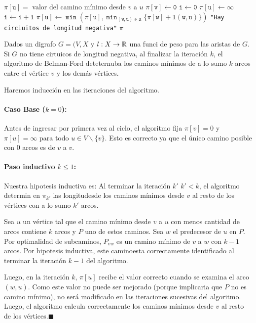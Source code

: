 \begin{algorithmic}
  \State $\mathtt{\pi[u] =}$ valor del camino mínimo desde $v$ a $u$
  \State
  \State $\mathtt{\pi[v] \gets 0}$
  \State $\mathtt{i \gets 0}$
  \State $\mathtt{\pi[u] \gets \infty}$
  \EndFor
  \State
  \State $\mathtt{i\gets i + 1}$
  \State $\mathtt{\pi[u] \gets \min(\pi[u], \min_{(w,u)\in X}\{\pi[w] + l(w,u)\})}$
  \EndFor
  \EndWhile
  \State\Return\texttt{"Hay circiuitos de longitud negativa"}
  \Else
  \State\Return \(\pi\)
  \EndIf
  \EndProcedure
\end{algorithmic}

\begin{lema}
  Dados un digrafo \(G=(V,X\) y \(l:X\to\mathbb{R}\) una funci de peso para las aristas de \(G\). Si \(G\) no tiene cirtuicos de longitud negativa, al finalizar la iteración \(k\), el algoritmo de Belman-Ford deteternuba los caminos mínimos de a lo sumo \(k\) arcos entre el vértice \(v\) y los demás vértices.
\end{lema}

\begin{demo}
  Haremos inducción en las iteraciones del algoritmo.

  \paragraph{Caso Base (\(k=0\)):} Antes de ingresar por primera vez al ciclo, el algoritmo fija \(\pi[v] = 0\) y \(\pi[u] = \infty\) para todo \(u\in V\backslash \{v\}\). Esto es correcto ya que el único camino posible con 0 arcos es de \(v\) a \(v\).

  \paragraph{Paso inductivo \(k \leq 1\):} Nuestra hipotesis inductiva es: Al terminar la iteración \(k'\) \( k' < k\), el algoritmo determin en \(\pi_{k'}\) las longitudesde los caminos mínimos desde \(v\) al resto de los vértices con a lo sumo \(k'\) arcos.

  Sea \(u\) un vértice tal que el camino mínimo desde \(v\) a \(u\) con menos cantidad de arcos contiene \(k\) arcos y \(P\) uno de estos caminos. Sea \(w\) el predecesor de \(u\) en \(P\). Por optimalidad de subcaminos, \(P_{vw}\) es un camino mínimo de \(v\) a \(w\) con \(k-1\) arcos. Por hipotesis inductiva, este caminoesta correctamente identificado al terminar la iteración \(k-1\) del algoritmo.

  Luego, en la iteración \(k\), \(\pi[u]\) recibe el valor correcto cuando se examina el arco \((w,u)\). Como este valor no puede ser mejorado (porque implicaria que \(P\) no es camino mínimo), no será modificado en las iteraciones sucesivas del algoritmo. Luego, el algoritmo calcula correctamente los caminos mínimos desde \(v\) al resto de los vértices.\hfill\(\blacksquare\)
\end{demo}
